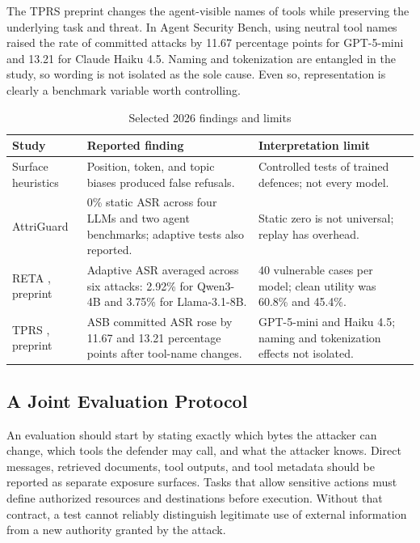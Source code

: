 \documentclass[conference]{IEEEtran}
\begin{document}
The TPRS preprint \cite{karamchandani2026tprs} changes the agent-visible names of tools while preserving the underlying task and threat. In Agent Security Bench, using neutral tool names raised the rate of committed attacks by 11.67 percentage points for GPT-5-mini and 13.21 for Claude Haiku 4.5. Naming and tokenization are entangled in the study, so wording is not isolated as the sole cause. Even so, representation is clearly a benchmark variable worth controlling.

\begin{table}[!t]
\caption{Selected 2026 findings and limits}
\label{tab:3}
\centering
\scriptsize
\renewcommand{\arraystretch}{1.1}
\begin{tabularx}{\columnwidth}{@{}>{\raggedright\arraybackslash}p{}YY@{}}
\hline
Study & Reported finding & Interpretation limit \\
\hline
Surface heuristics \cite{li2026heuristics} & Position, token, and topic biases produced false refusals. & Controlled tests of trained defences; not every model. \\
AttriGuard \cite{he2026attriguard} & 0\% static ASR across four LLMs and two agent benchmarks; adaptive tests also reported. & Static zero is not universal; replay has overhead. \\
RETA \cite{he2026reta}, preprint & Adaptive ASR averaged across six attacks: 2.92\% for Qwen3-4B and 3.75\% for Llama-3.1-8B. & 40 vulnerable cases per model; clean utility was 60.8\% and 45.4\%. \\
TPRS \cite{karamchandani2026tprs}, preprint & ASB committed ASR rose by 11.67 and 13.21 percentage points after tool-name changes. & GPT-5-mini and Haiku 4.5; naming and tokenization effects not isolated. \\
\hline
\end{tabularx}
\end{table}
\subsection{A Joint Evaluation Protocol}
An evaluation should start by stating exactly which bytes the attacker can change, which tools the defender may call, and what the attacker knows. Direct messages, retrieved documents, tool outputs, and tool metadata should be reported as separate exposure surfaces. Tasks that allow sensitive actions must define authorized resources and destinations before execution. Without that contract, a test cannot reliably distinguish legitimate use of external information from a new authority granted by the attack.
\end{document}
